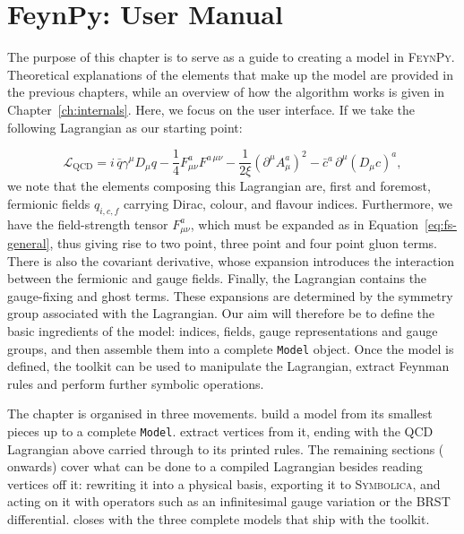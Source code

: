 

\chapter{FeynPy: User Manual}
\label{ch:feynpy}

The purpose of this chapter is to serve as a guide to creating a model in \textsc{FeynPy}. Theoretical explanations of the elements that make up the model are provided in the previous chapters, while an overview of how the algorithm works is given in Chapter~\ref{ch:internals}. Here, we focus on the user interface. If we take the following Lagrangian as our starting point:

\begin{equation}
\mathcal{L}_{\mathrm{QCD}}
=
i\,\bar{q}\gamma^\mu D_\mu q
-\frac{1}{4}F_{\mu\nu}^{a}F^{a\,\mu\nu}
-\frac{1}{2\xi}
\left(\partial^\mu A_\mu^{a}\right)^2
-\bar{c}^{a}\,\partial^\mu(D_\mu c)^{a},
\end{equation}
we note that the elements composing this Lagrangian are, first and foremost,
fermionic fields \(q_{i,c,f}\) carrying Dirac, colour, and flavour indices. Furthermore, we have the field-strength tensor $F^a_{\mu\nu}$, which must be expanded as in Equation~\ref{eq:fs-general}, thus giving rise to two point, three point and four point gluon terms. There is also the covariant derivative, whose
expansion introduces the interaction between the fermionic and gauge fields.
Finally, the Lagrangian contains the gauge-fixing and ghost terms. These
expansions are determined by the symmetry group associated with the
Lagrangian. Our aim will therefore be to define the basic ingredients of the model: indices, fields, gauge representations and gauge groups, and then assemble them into a complete \texttt{Model} object. Once the model is defined, the toolkit can be used to manipulate the Lagrangian, extract Feynman rules and perform further symbolic operations.

The chapter is organised in three movements.
build a model from its smallest pieces up to a complete \texttt{Model}.
extract vertices from it, ending with the QCD Lagrangian above carried
through to its printed rules. The remaining sections
( onwards) cover what can be done to a
compiled Lagrangian besides reading vertices off it: rewriting it into a
physical basis, exporting it to \textsc{Symbolica}, and acting on it with
operators such as an infinitesimal gauge variation or the BRST differential.
 closes with the three complete models that ship with
the toolkit.




